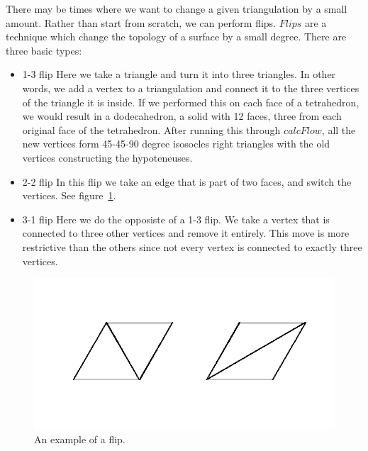 \documentclass[12pt]{article}
\begin{document}
There may be times where we want to change a given triangulation by a small amount. Rather than start from scratch, we can perform flips. $Flips$ are a technique which change the topology of a surface by a small degree. There are three basic types:

\begin{itemize}
\item 1-3 flip \newline
Here we take a triangle and turn it into three triangles. In other words, we add a vertex to a triangulation and connect it to the three vertices of the triangle it is inside. If we performed this on each face of a tetrahedron, we would result in a dodecahedron, a solid with 12 faces, three from each original face of the tetrahedron. After running this through $calcFlow$, all the new vertices form 45-45-90 degree isosocles right triangles with the old vertices constructing the hypoteneuses. 
\item 2-2 flip \newline
In this flip we take an edge that is part of two faces, and switch the vertices. See figure~\ref{fig:flip}. 
\item 3-1 flip \newline
Here we do the opposiste of a 1-3 flip. We take a vertex that is connected to three other vertices and remove it entirely. This move is more restrictive than the others since not every vertex is connected to exactly three vertices. 
\end{itemize}
\begin{figure}
\centering
\includegraphics[scale = 1.0]{Flip.png}
\caption{An example of a flip.}
\label{fig:flip}
\end{figure}
  
\end{document}

